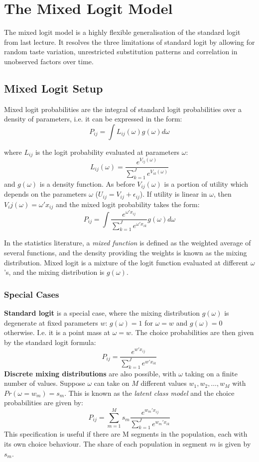 \documentclass[DIV=14,titlepage=false]{scrreprt}
\begin{document}
\vspace{-10pt}
\setcounter{chapter}{3}


\chapter{The Mixed Logit Model}
The mixed logit model is a highly flexible generalisation of the standard logit from last lecture. It resolves the three limitations of standard logit by allowing for random taste variation, unrestricted substitution patterns and correlation in unobserved factors over time.
\section{Mixed Logit Setup}
Mixed logit probabilities are the integral of standard logit probabilities over a density of parameters, i.e. it can be expressed in the form:
\begin{equation}
    P_{ij} = \int L_{ij}(\omega)g(\omega)d\omega \label{eq:mixed_logit}
\end{equation}

where $L_{ij}$ is the logit probability evaluated at parameters $\omega$:
\[
    L_{ij}(\omega) = \frac{e^{V_{ij}(\omega)}}{\sum_{k=1}^{J}e^{V_{ik}(\omega)}}
\]
and $g(\omega)$ is a density function. As before $V_{ij}(\omega)$ is a portion of utility which depends on the parameters $\omega$ ($U_{ij} = V_{ij} + \epsilon_{ij}$). If utility is linear in $\omega$, then $V_ij(\omega) = \omega'x_{ij}$ and the mixed logit probability takes the form:
\[
    P_{ij} = \int \frac{e^{\omega'x_{ij}}}{\sum_{k=1}^{J}e^{\omega'x_{ik}}}g(\omega)d\omega
\]
\begin{note}
In the statistics literature, a \textit{mixed function} is defined as the weighted average of several functions, and the density providing the weights is known as the mixing distribution. Mixed logit is a mixture of the logit function evaluated at different $\omega$'s, and the mixing distribution is $g(\omega)$.
\end{note}
\subsection{Special Cases}
\textbf{Standard logit} is a special case, where the mixing distribution $g(\omega)$ is degenerate at fixed parameters $w$: $g(\omega) = 1$ for $\omega = w$ and $g(\omega) = 0$ otherwise. I.e. it is a point mass at $\omega = w$. The choice probabilities are then given by the standard logit formula:
\[
    P_{ij} = \frac{e^{w'x_{ij}}}{\sum_{k=1}^{J}e^{w'x_{ik}}}
\]
\textbf{Discrete mixing distributions} are also possible, with $\omega$ taking on a finite number of values. Suppose $\omega$ can take on $M$ different values $w_1, w_2, \dots, w_M$ with $Pr(\omega = w_m) = s_m$. This is known as the \textit{latent class model} and the choice probabilities are given by:
\[
    P_{ij} = \sum_{m=1}^{M}s_m \frac{e^{w_m'x_{ij}}}{\sum_{k=1}^{J}e^{w_m'x_{ik}}}
\]
This specification is useful if there are M segments in the population, each with its own choice behaviour. The share of each population in segment $m$ is given by $s_m$.
\end{document}
